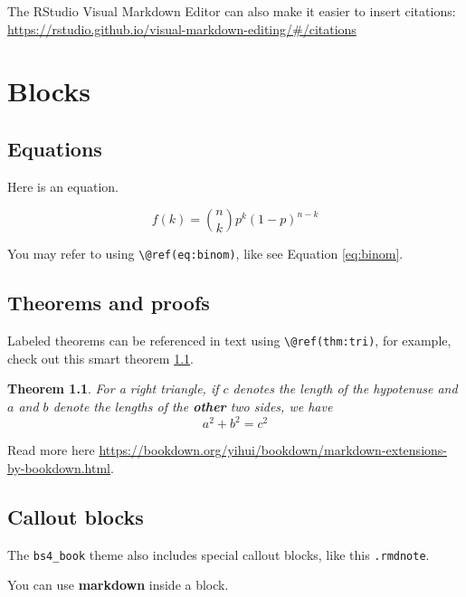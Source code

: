 \documentclass[
]{book}
\newtheorem{theorem}{Theorem}[chapter]
\theoremstyle{definition}
\theoremstyle{definition}
\theoremstyle{definition}
\theoremstyle{definition}
\theoremstyle{remark}
\begin{document}
The RStudio Visual Markdown Editor can also make it easier to insert citations: \url{https://rstudio.github.io/visual-markdown-editing/\#/citations}

\hypertarget{blocks}{%
\chapter{Blocks}\label{blocks}}

\hypertarget{equations}{%
\section{Equations}\label{equations}}

Here is an equation.

\begin{equation} 
  f\left(k\right) = \binom{n}{k} p^k\left(1-p\right)^{n-k}
  \label{eq:binom}
\end{equation}

You may refer to using \texttt{\textbackslash{}@ref(eq:binom)}, like see Equation \eqref{eq:binom}.

\hypertarget{theorems-and-proofs}{%
\section{Theorems and proofs}\label{theorems-and-proofs}}

Labeled theorems can be referenced in text using \texttt{\textbackslash{}@ref(thm:tri)}, for example, check out this smart theorem \ref{thm:tri}.

\begin{theorem}
\protect\hypertarget{thm:tri}{}\label{thm:tri}For a right triangle, if \(c\) denotes the \emph{length} of the hypotenuse
and \(a\) and \(b\) denote the lengths of the \textbf{other} two sides, we have
\[a^2 + b^2 = c^2\]
\end{theorem}

Read more here \url{https://bookdown.org/yihui/bookdown/markdown-extensions-by-bookdown.html}.

\hypertarget{callout-blocks}{%
\section{Callout blocks}\label{callout-blocks}}

The \texttt{bs4\_book} theme also includes special callout blocks, like this \texttt{.rmdnote}.

You can use \textbf{markdown} inside a block.
\end{document}
